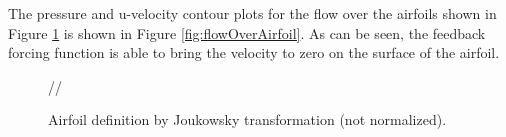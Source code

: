 \documentclass{aiaa-pretty}
\begin{document}
The pressure and u-velocity contour plots for the flow over the airfoils shown in Figure \ref{fig:joukowskiChamber} is shown in Figure \ref{fig:flowOverAirfoil}. As can be seen, the feedback forcing function is able to bring the velocity to zero on the surface of the airfoil.

%
	\begin{figure}[H]
		\centering
		\quad
		//
		\quad
		\caption{Airfoil definition by Joukowsky transformation (not normalized).}
		\label{fig:joukowskiChamber}
	\end{figure}
%
\end{document}
